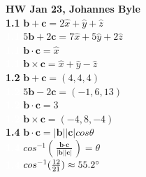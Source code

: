 \documentclass[english]{article}
\begin{document}
\textbf{HW Jan 23, Johannes Byle}\\

\noindent
\textbf{1.1} $\textbf{b}+\textbf{c}=2\hat{x}+\hat{y}+\hat{z}$\\
\textcolor{white}{\textbf{1.1}} $5\textbf{b}+2\textbf{c}=7\hat{x}+5\hat{y}+2\hat{z}$\\
\textcolor{white}{\textbf{1.1}} $\textbf{b}\cdot\textbf{c}=\hat{x}$\\
\textcolor{white}{\textbf{1.1}} $\textbf{b}\times\textbf{c}=\hat{x}+\hat{y}-\hat{z}$\\

\noindent
\textbf{1.2} $\textbf{b}+\textbf{c}=(4,4,4)$\\
\textcolor{white}{\textbf{1.2}} $5\textbf{b}-2\textbf{c}=(-1,6,13)$\\ 
\textcolor{white}{\textbf{1.2}} $\textbf{b}\cdot\textbf{c}=3$\\
\textcolor{white}{\textbf{1.2}} $\textbf{b}\times\textbf{c}=(-4,8,-4)$\\

\noindent
\textbf{1.4} $\textbf{b}\cdot\textbf{c}=|\textbf{b}||\textbf{c}|cos\theta$\\
\textcolor{white}{\textbf{1.4}} $cos^{-1}(\frac{\textbf{b}\cdot\textbf{c}}{|\textbf{b}||\textbf{c}|})=\theta$\\
\textcolor{white}{\textbf{1.4}} $cos^{-1}(\frac{12}{21})\approx 55.2\degree$\\
\end{document}
